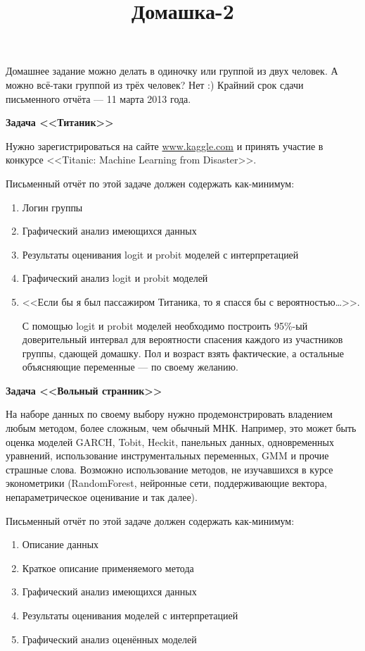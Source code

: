 \documentclass[pdftex,12pt,a4paper]{article}
\title{Домашка-2}
\date{}
\begin{document}
\pagestyle{empty}
\maketitle



Домашнее задание можно делать в одиночку или группой из двух человек. А можно всё-таки группой из трёх человек? Нет :) Крайний срок сдачи письменного отчёта --- 11 марта 2013 года.

\vspace{15pt}

\textbf{Задача <<Титаник>> }

\vspace{15pt}

Нужно зарегистрироваться на сайте \url{www.kaggle.com} и принять участие в конкурсе <<Titanic: Machine Learning from Disaster>>. 

Письменный отчёт по этой задаче должен содержать как-минимум:
\begin{enumerate}
\item Логин группы
\item Графический анализ имеющихся данных
\item Результаты оценивания logit и probit моделей с интерпретацией
\item Графический анализ logit и probit моделей
\item <<Если бы я был пассажиром Титаника, то я спасся бы с вероятностью\ldots>>. 

С помощью logit и probit моделей необходимо построить 95\%-ый доверительный интервал для вероятности спасения каждого из участников группы, сдающей домашку. Пол и возраст взять фактические, а остальные объясняющие переменные --- по своему желанию.
\end{enumerate}

\vspace{15pt}

\textbf{Задача <<Вольный странник>>}

\vspace{15pt}

На наборе данных по своему выбору нужно продемонстрировать владением любым методом, более сложным, чем обычный МНК. Например, это может быть оценка моделей GARCH, Tobit, Heckit, панельных данных, одновременных уравнений, использование инструментальных переменных, GMM и прочие страшные слова. Возможно использование методов, не изучавшихся в курсе эконометрики (RandomForest, нейронные сети, поддерживающие вектора, непараметрическое оценивание и так далее).

Письменный отчёт по этой задаче должен содержать как-минимум:
\begin{enumerate}
\item Описание данных
\item Краткое описание применяемого метода
\item Графический анализ имеющихся данных
\item Результаты оценивания моделей с интерпретацией
\item Графический анализ оценённых моделей
\end{enumerate}
\end{document}
